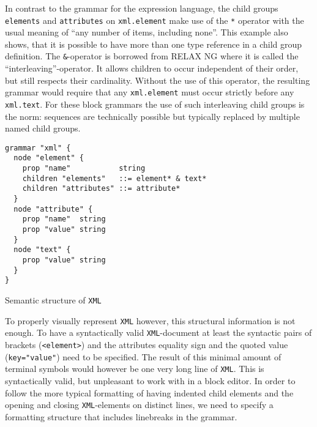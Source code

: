\documentclass[sigconf,natbib=false,review=true,anonymous]{acmart}
\begin{document}
In contrast to the grammar for the expression language, the child groups \texttt{elements} and \texttt{attributes} on \texttt{xml.element} make use of the \texttt{*} operator with the usual meaning of \enquote{any number of items, including none}. This example also shows, that it is possible to have more than one type reference in a child group definition. The \texttt{\&}-operator is borrowed from RELAX NG where it is called the \enquote{interleaving}-operator. It allows children to occur independent of their order, but still respects their cardinality. Without the use of this operator, the resulting grammar would require that any \texttt{xml.element} must occur strictly before any \texttt{xml.text}. For these block grammars the use of such interleaving child groups is the norm: sequences are technically possible but typically replaced by multiple named child groups.

\begin{listing}[H]
\begin{verbatim}
grammar "xml" {
  node "element" {
    prop "name"           string
    children "elements"   ::= element* & text*
    children "attributes" ::= attribute*
  }
  node "attribute" {
    prop "name"  string
    prop "value" string
  }
  node "text" {
    prop "value" string
  }
}
\end{verbatim}
\caption{Semantic structure of \texttt{XML}}
\label{lst:grammar-xml-structure}
\end{listing}

To properly visually represent \texttt{XML} however, this structural information is not enough. To have a syntactically valid \texttt{XML}-document at least the syntactic pairs of brackets (\texttt{<element>}) and the attributes equality sign and the quoted value (\texttt{key="value"}) need to be specified. The result of this minimal amount of terminal symbols would however be one very long line of \texttt{XML}. This is syntactically valid, but unpleasant to work with in a block editor. In order to follow the more typical formatting of having indented child elements and the opening and closing \texttt{XML}-elements on distinct lines, we need to specify a formatting structure that includes linebreaks in the grammar.
\end{document}
